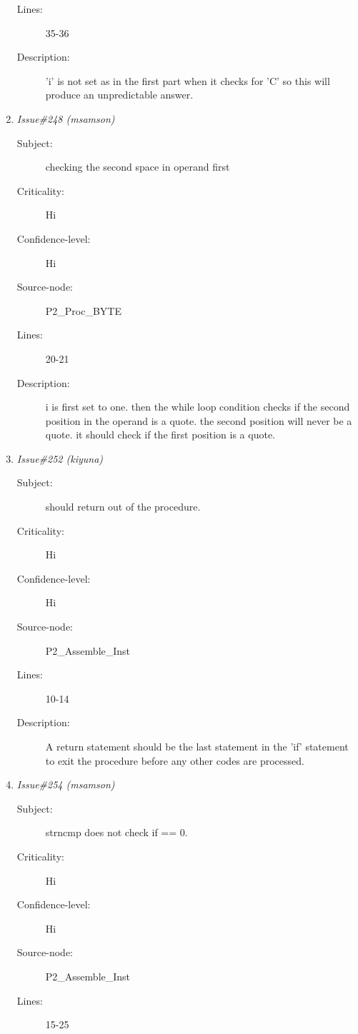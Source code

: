\begin{enumerate}
\begin{description}
\item [Lines:] 35-36

\item [Description:] 'i' is not set as in the first part when it
checks for 'C' so this will produce an unpredictable answer.
\end{description}
\item {\it Issue\#248 (msamson)}
\begin{description}
\item [Subject:] checking the second space in operand first
\item [Criticality:] Hi
\item [Confidence-level:] Hi
\item [Source-node:] P2\_Proc\_BYTE

\item [Lines:] 20-21

\item [Description:] i is first set to one.  then the while loop
condition checks if the second position in the operand is a quote. the second
position will never be a quote.  it should check if the first position is a
quote.
\end{description}
\item {\it Issue\#252 (kiyuna)}
\begin{description}
\item [Subject:] should return out of the procedure.
\item [Criticality:] Hi
\item [Confidence-level:] Hi
\item [Source-node:] P2\_Assemble\_Inst

\item [Lines:] 10-14

\item [Description:] A return statement should be the last
statement in the 'if' statement to exit the procedure before any other codes
are processed.
\end{description}
\item {\it Issue\#254 (msamson)}
\begin{description}
\item [Subject:] strncmp does not check if == 0.
\item [Criticality:] Hi
\item [Confidence-level:] Hi
\item [Source-node:] P2\_Assemble\_Inst

\item [Lines:] 15-25


\end{description}
\end{enumerate}
